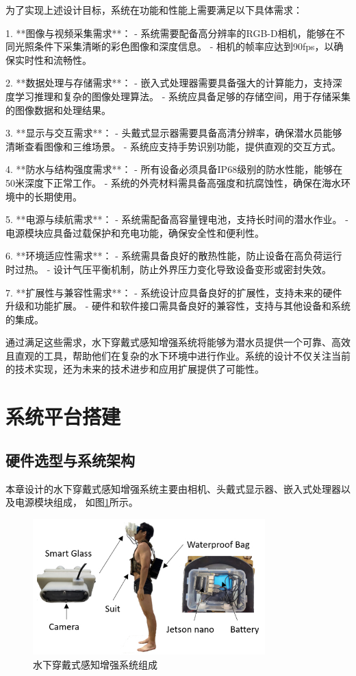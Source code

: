 为了实现上述设计目标，系统在功能和性能上需要满足以下具体需求：

1. **图像与视频采集需求**：
   - 系统需要配备高分辨率的RGB-D相机，能够在不同光照条件下采集清晰的彩色图像和深度信息。
   - 相机的帧率应达到90fps，以确保实时性和流畅性。

2. **数据处理与存储需求**：
   - 嵌入式处理器需要具备强大的计算能力，支持深度学习推理和复杂的图像处理算法。
   - 系统应具备足够的存储空间，用于存储采集的图像数据和处理结果。

3. **显示与交互需求**：
   - 头戴式显示器需要具备高清分辨率，确保潜水员能够清晰查看图像和三维场景。
   - 系统应支持手势识别功能，提供直观的交互方式。

4. **防水与结构强度需求**：
   - 所有设备必须具备IP68级别的防水性能，能够在50米深度下正常工作。
   - 系统的外壳材料需具备高强度和抗腐蚀性，确保在海水环境中的长期使用。

5. **电源与续航需求**：
   - 系统需配备高容量锂电池，支持长时间的潜水作业。
   - 电源模块应具备过载保护和充电功能，确保安全性和便利性。

6. **环境适应性需求**：
   - 系统需具备良好的散热性能，防止设备在高负荷运行时过热。
   - 设计气压平衡机制，防止外界压力变化导致设备变形或密封失效。

7. **扩展性与兼容性需求**：
   - 系统设计应具备良好的扩展性，支持未来的硬件升级和功能扩展。
   - 硬件和软件接口需具备良好的兼容性，支持与其他设备和系统的集成。

通过满足这些需求，水下穿戴式感知增强系统将能够为潜水员提供一个可靠、高效且直观的工具，帮助他们在复杂的水下环境中进行作业。系统的设计不仅关注当前的技术实现，还为未来的技术进步和应用扩展提供了可能性。



\section{系统平台搭建} 
\subsection{硬件选型与系统架构}
本章设计的水下穿戴式感知增强系统主要由相机、头戴式显示器、嵌入式处理器以及电源模块组成，
如图\ref{img:system}所示。
\begin{figure}
    \centering
    \includegraphics[width=0.8\textwidth]{figures/ch5/architecture of system.jpg}
    \caption{水下穿戴式感知增强系统组成}
    \label{img:system}
\end{figure}


